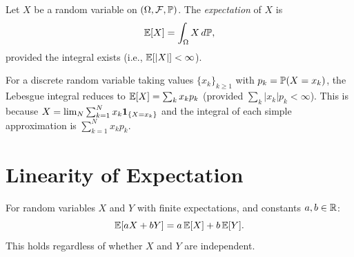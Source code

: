 \documentclass[11pt,a4paper]{article}
\begin{document}
\begin{definition}[Expectation]
\label{def:expectation}
Let $X$ be a random variable on $(\Omega, \mathcal{F}, \mathbb{P})$. The
\emph{expectation} of $X$ is
\begin{equation}
  \mathbb{E}[X] = \int_\Omega X\, d\mathbb{P},
  \label{eq:expectation}
\end{equation}
provided the integral exists (i.e., $\mathbb{E}[|X|] < \infty$).
\end{definition}

\begin{remark}
For a discrete random variable taking values $\{x_k\}_{k \geq 1}$ with
$p_k = \mathbb{P}(X = x_k)$, the Lebesgue integral reduces to
$\mathbb{E}[X] = \sum_k x_k p_k$ (provided $\sum_k |x_k| p_k < \infty$). This is
because $X = \lim_N \sum_{k=1}^N x_k \mathbf{1}_{\{X = x_k\}}$ and the
integral of each simple approximation is $\sum_{k=1}^N x_k p_k$.
\end{remark}


\section{Linearity of Expectation}
\label{sec:linearity}

\begin{keyresult}[title={Linearity of Expectation}]
\begin{theorem}
\label{thm:linearity}
For random variables $X$ and $Y$ with finite expectations, and constants
$a, b \in \mathbb{R}$:
\begin{equation}
  \mathbb{E}[aX + bY] = a\,\mathbb{E}[X] + b\,\mathbb{E}[Y].
  \label{eq:linearity}
\end{equation}
This holds regardless of whether $X$ and $Y$ are independent.
\end{theorem}
\end{keyresult}
\end{document}
